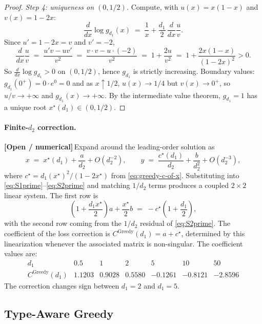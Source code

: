 \documentclass{article}
\theoremstyle{plain}
\theoremstyle{definition}
\newcommand{\open}{\textcolor{openred}{\textbf{[Open / numerical]}}\,}
\begin{document}
\begin{proof}
\emph{Step 4: uniqueness on $(0,1/2)$.} Compute, with $u(x)=x(1-x)$ and $v(x)=1-2x$:
\[
\frac{d}{dx}\log g_{d_1}(x)\;=\;\frac{1}{x}+\frac{d_1}{2}\,\frac{d}{dx}\frac{u}{v}.
\]
Since $u'=1-2x=v$ and $v'=-2$,
\[
\frac{d}{dx}\frac{u}{v}\;=\;\frac{u'v-uv'}{v^2}\;=\;\frac{v\cdot v-u\cdot(-2)}{v^2}\;=\;1+\frac{2u}{v^2}\;=\;1+\frac{2x(1-x)}{(1-2x)^2}>0.
\]
So $\frac{d}{dx}\log g_{d_1}>0$ on $(0,1/2)$, hence $g_{d_1}$ is strictly increasing. Boundary values: $g_{d_1}(0^+)=0\cdot e^0=0$ and as $x\uparrow 1/2$, $u(x)\to 1/4$ but $v(x)\to 0^+$, so $u/v\to+\infty$ and $g_{d_1}(x)\to+\infty$. By the intermediate value theorem, $g_{d_1}=1$ has a unique root $x^\star(d_1)\in(0,1/2)$.
\end{proof}

\paragraph{Finite-$d_2$ correction.}
\open Expand around the leading-order solution as
\[
x\;=\;x^\star(d_1)+\frac{a}{d_2}+O(d_2^{-2}),\qquad y\;=\;\frac{c^\star(d_1)}{d_2}+\frac{b}{d_2^2}+O(d_2^{-3}),
\]
where $c^\star=d_1(x^\star)^2/(1-2x^\star)$ from \eqref{eq:greedy-c-of-x}. Substituting into \eqref{eq:S1prime}--\eqref{eq:S2prime} and matching $1/d_2$ terms produces a coupled $2\times 2$ linear system. The first row is
\[
\left(1+\frac{d_1x^\star}{2}\right)a+\frac{x^\star}{2}b
\;=\;-c^\star\left(1+\frac{d_1}{2}\right),
\]
with the second row coming from the $1/d_2$ residual of \eqref{eq:S2prime}. The coefficient of the loss correction is $C^{\text{Greedy}}(d_1)=a+c^\star$, determined by this linearization whenever the associated matrix is non-singular. The coefficient values are:
\[
\begin{array}{r|rrrrrr}
d_1 & 0.5 & 1 & 2 & 5 & 10 & 50\\\hline
C^{\text{Greedy}}(d_1) & 1.1203 & 0.9028 & 0.5580 & -0.1261 & -0.8121 & -2.8596
\end{array}
\]
The correction changes sign between $d_1=2$ and $d_1=5$.


\subsection{Type-Aware Greedy}\label{ssec:TAG-d2}
\end{document}
